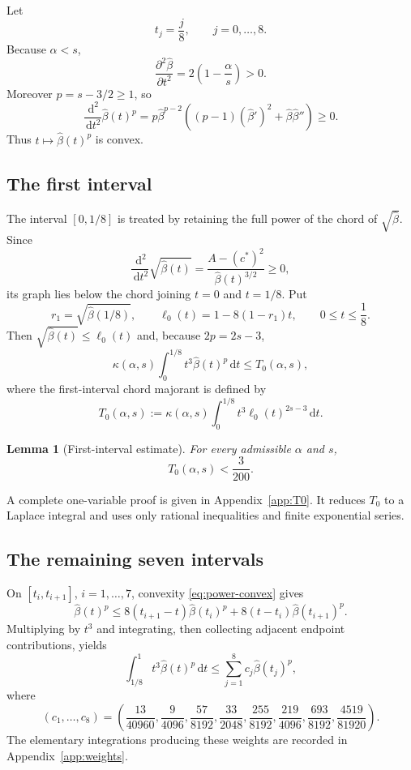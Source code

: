 \documentclass[11pt]{amsart}
\newtheorem{lemma}[theorem]{Lemma}
\theoremstyle{definition}
\newcommand{\dd}{\,\mathrm d}
\newcommand{\betaHat}{\widehat\beta}
\begin{document}
Let
\[
 t_j=\frac j8,
 \qquad j=0,\ldots,8.
\]
Because $\alpha<s$,
\[
 \frac{\partial^2\betaHat}{\partial t^2}
 =2\left(1-\frac\alpha s\right)>0.
\]
Moreover $p=s-3/2\ge1$, so
\begin{equation}\label{eq:power-convex}
 \frac{\dd^2}{\dd t^2}\betaHat(t)^p
 =p\betaHat^{p-2}
 \left((p-1)(\betaHat')^2+\betaHat\betaHat''\right)\ge0.
\end{equation}
Thus $t\mapsto\betaHat(t)^p$ is convex.

\subsection{The first interval}

The interval $[0,1/8]$ is treated by retaining the full power of the chord of $\sqrt{\betaHat}$.  Since
\[
 \frac{\dd^2}{\dd t^2}\sqrt{\betaHat(t)}
 =\frac{A-(c^{\ast})^2}{\betaHat(t)^{3/2}}\ge0,
\]
its graph lies below the chord joining $t=0$ and $t=1/8$.  Put
\[
 r_1=\sqrt{\betaHat(1/8)},
 \qquad
 \ell_0(t)=1-8(1-r_1)t,
 \qquad 0\le t\le\frac18.
\]
Then $\sqrt{\betaHat(t)}\le\ell_0(t)$ and, because $2p=2s-3$,
\[
 \kappa(\alpha,s)\int_0^{1/8}t^3\betaHat(t)^p\dd t
 \le T_0(\alpha,s),
\]
where the first-interval chord majorant is defined by
\begin{equation}\label{eq:T0-def}
 T_0(\alpha,s)
 :=\kappa(\alpha,s)\int_0^{1/8}t^3\ell_0(t)^{2s-3}\dd t.
\end{equation}

\begin{lemma}[First-interval estimate]\label{lem:T0}
For every admissible $\alpha$ and $s$,
\[
 T_0(\alpha,s)<\frac3{200}.
\]
\end{lemma}

A complete one-variable proof is given in Appendix~\ref{app:T0}.  It reduces $T_0$ to a Laplace integral and uses only rational inequalities and finite exponential series.

\subsection{The remaining seven intervals}

On $[t_i,t_{i+1}]$, $i=1,\ldots,7$, convexity \eqref{eq:power-convex} gives
\[
 \betaHat(t)^p
 \le
 8(t_{i+1}-t)\betaHat(t_i)^p
 +8(t-t_i)\betaHat(t_{i+1})^p.
\]
Multiplying by $t^3$ and integrating, then collecting adjacent endpoint contributions, yields
\begin{equation}\label{eq:nodal-decomp}
 \int_{1/8}^{1}t^3\betaHat(t)^p\dd t
 \le\sum_{j=1}^{8}c_j\betaHat(t_j)^p,
\end{equation}
where
\begin{equation}\label{eq:weights}
(c_1,\ldots,c_8)=
\left(
\frac{13}{40960},\frac9{4096},\frac{57}{8192},\frac{33}{2048},
\frac{255}{8192},\frac{219}{4096},\frac{693}{8192},
\frac{4519}{81920}
\right).
\end{equation}
The elementary integrations producing these weights are recorded in Appendix~\ref{app:weights}.
\end{document}
